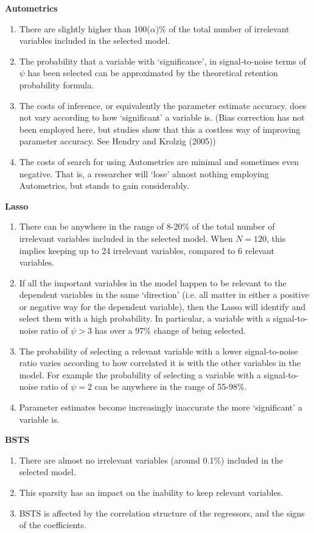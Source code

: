 \textbf{Autometrics}
\begin{enumerate}
\item There are slightly higher than 100($\alpha$)\% of the total number of irrelevant variables included in the selected model. 
\item The probability that a variable with `significance', in signal-to-noise terms of $\psi$ has been selected can be approximated by the theoretical retention probability formula.
\item The costs of inference, or equivalently the parameter estimate accuracy, does not vary according to how `significant' a variable is. (Bias correction has not been employed here, but studies show that this a costless way of improving parameter accuracy. See Hendry and Krolzig (2005))
\item The costs of search for using Autometrics are minimal and sometimes even negative. That is, a researcher will `lose' almost nothing employing Autometrics, but stands to gain considerably.
\end{enumerate}

\textbf{Lasso}
\begin{enumerate}
\item There can be anywhere in the range of 8-20\% of the total number of irrelevant variables included in the selected model. When $N=120$, this implies keeping up to 24 irrelevant variables, compared to 6 relevant variables.
\item If all the important variables in the model happen to be relevant to the dependent variables in the same `direction' (i.e. all matter in either a positive or negative way for the dependent variable), then the Lasso will identify and select them with a high probability. In particular, a variable with a signal-to-noise ratio of $\psi>3$ has over a 97\% change of being selected.
\item The probability of selecting a relevant variable with a lower signal-to-noise ratio varies according to how correlated it is with the other variables in the model. For example the probability of selecting a variable with a signal-to-noise ratio of $\psi=2$ can be anywhere in the range of 55-98\%. 
\item Parameter estimates become increasingly inaccurate the more `significant' a variable is.
\end{enumerate}

\textbf{BSTS}
\begin{enumerate}
\item There are almost no irrelevant variables (around 0.1\%) included in the selected model.
\item This sparsity has an impact on the inability to keep relevant variables.
\item BSTS is affected by the correlation structure of the regressors, and the signs of the coefficients.
\end{enumerate}